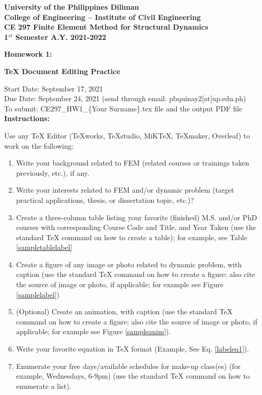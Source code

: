 \documentclass[12pt,a4paper]{article}
\begin{document}
\begin{center}
  \textbf{University of the Philippines Diliman\\ College of Engineering -- Institute of Civil Engineering} \\

  \textbf{CE 297 Finite Element Method for Structural Dynamics \\ 1$^{st}$ Semester A.Y. 2021-2022} \\

  \bigskip
  \bigskip

  \textbf{Homework 1:}

  \textbf{TeX Document Editing Practice}
\end{center}

\bigskip

\noindent Start Date: September 17, 2021 \\
\noindent Due Date: September 24, 2021 (send through email: pbquinay2[at]up.edu.ph)\\
\noindent To submit: CE297\_HW1\_\{Your Surname\}.tex file and the output PDF file\\

\noindent \textbf{Instructions:}

Use any TeX Editor (TeXworks, TeXstudio, MiKTeX, TeXmaker, Overleaf) to work on the following:

\begin{enumerate}
  \item Write your background related to FEM (related courses or trainings taken previously, etc.), if any.

  \item Write your interests related to FEM and/or dynamic problem (target practical applications, thesis, or dissertation topic, etc.)?

  \item Create a three-column table listing your favorite (finished) M.S. and/or PhD courses with corresponding Course Code and Title, and Year Taken (use the standard TeX command on how to create a table); for example, see Table \ref{sampletablelabel}

  \item Create a figure of any image or photo related to dynamic problem, with caption (use the standard TeX command on how to create a figure; also cite the source of image or photo, if applicable; for example see Figure \ref{samplelabel})

  \item (Optional) Create an animation, with caption (use the standard TeX command on how to create a figure; also cite the source of image or photo, if applicable; for example see Figure \ref{sampleanim}).

  \item Write your favorite equation in TeX format (Example, See Eq. \ref{labeleq1}).

  \item Enumerate your free days/available schedules for make-up class(es) (for example, Wednesdays, 6-9pm) (use the standard TeX command on how to enumerate a list).



\end{enumerate}
\end{document}

